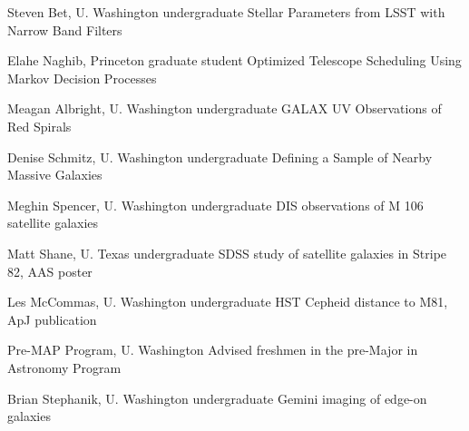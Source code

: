 
\employer{}Steven Bet, U. Washington undergraduate
Stellar Parameters from LSST with Narrow Band Filters

\employer{}Elahe Naghib, Princeton graduate student
Optimized Telescope Scheduling Using Markov Decision Processes

\employer{}Meagan Albright, U. Washington undergraduate
GALAX UV Observations of Red Spirals

\employer{}Denise Schmitz, U. Washington undergraduate
Defining a Sample of Nearby Massive Galaxies

\employer{}Meghin Spencer, U. Washington undergraduate
DIS observations of M 106 satellite galaxies

\employer{}Matt Shane, U. Texas undergraduate
SDSS study of satellite galaxies in Stripe 82, AAS poster

\employer{}Les McCommas, U. Washington undergraduate
HST Cepheid distance to M81, ApJ publication

\employer{}Pre-MAP Program, U. Washington
Advised freshmen in the pre-Major in Astronomy Program
 
\employer{}Brian Stephanik, U. Washington undergraduate
Gemini imaging of edge-on galaxies
